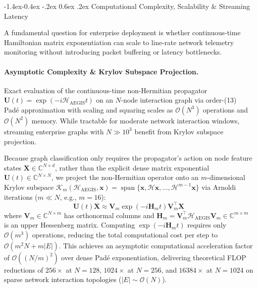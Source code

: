\documentclass[10pt,twocolumn,letterpaper]{article}
\makeatletter
\renewcommand\subsection{\@startsection{subsection}{2}{\z@}%
                                     {-1.4ex\@plus -0.4ex \@minus -.2ex}%
                                     {0.6ex \@plus .2ex}%
                                     {\normalfont\normalsize\bfseries}}
\makeatother
\begin{document}
\subsection{Computational Complexity, Scalability \& Streaming Latency}
\label{sec:complexity_latency}

A fundamental question for enterprise deployment is whether continuous-time Hamiltonian matrix exponentiation can scale to line-rate network telemetry monitoring without introducing packet buffering or latency bottlenecks.

\paragraph{Asymptotic Complexity \& Krylov Subspace Projection.}
Exact evaluation of the continuous-time non-Hermitian propagator $\mathbf{U}(t) = \exp(-i \mathcal{H}_{\text{AEGIS}} t)$ on an $N$-node interaction graph via order-(13) Padé approximation with scaling and squaring scales as $\mathcal{O}(N^3)$ operations and $\mathcal{O}(N^2)$ memory. While tractable for moderate network interaction windows, streaming enterprise graphs with $N \gg 10^3$ benefit from Krylov subspace projection. 

Because graph classification only requires the propagator's action on node feature states $\mathbf{X} \in \mathbb{C}^{N \times d}$, rather than the explicit dense matrix exponential $\mathbf{U}(t) \in \mathbb{C}^{N \times N}$, we project the non-Hermitian operator onto an $m$-dimensional Krylov subspace $\mathcal{K}_m(\mathcal{H}_{\text{AEGIS}}, \mathbf{x}) = \operatorname{span}\{\mathbf{x}, \mathcal{H} \mathbf{x}, \dots, \mathcal{H}^{m-1} \mathbf{x}\}$ via Arnoldi iterations ($m \ll N$, e.g., $m=16$):
\begin{equation}
\mathbf{U}(t) \mathbf{X} \approx \mathbf{V}_m \exp\left(-i \mathbf{H}_m t\right) \mathbf{V}_m^\top \mathbf{X}
\end{equation}
where $\mathbf{V}_m \in \mathbb{C}^{N \times m}$ has orthonormal columns and $\mathbf{H}_m = \mathbf{V}_m^\top \mathcal{H}_{\text{AEGIS}} \mathbf{V}_m \in \mathbb{C}^{m \times m}$ is an upper Hessenberg matrix. Computing $\exp(-i \mathbf{H}_m t)$ requires only $\mathcal{O}(m^3)$ operations, reducing the total computational cost per step to $\mathcal{O}(m^2 N + m |E|)$. This achieves an asymptotic computational acceleration factor of $\mathcal{O}((N/m)^2)$ over dense Padé exponentiation, delivering theoretical FLOP reductions of $256\times$ at $N=128$, $1024\times$ at $N=256$, and $16384\times$ at $N=1024$ on sparse network interaction topologies ($|E| \sim \mathcal{O}(N)$).
\end{document}
